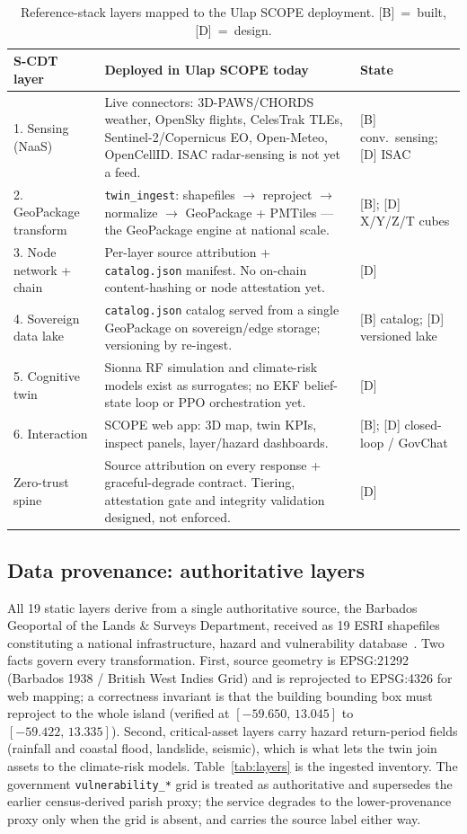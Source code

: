 \documentclass[10pt,twocolumn]{article}
\begin{document}
\begin{table}[t]\footnotesize\centering
\caption{Reference-stack layers mapped to the Ulap SCOPE deployment.
[B]~=~built, [D]~=~design.}\label{tab:map}
\begin{tabular}{@{}p{2.5cm}p{11.1cm}p{2.0cm}@{}}
\toprule
S-CDT layer & Deployed in Ulap SCOPE today & State\\
\midrule
1. Sensing (NaaS) & Live connectors: 3D-PAWS/CHORDS weather, OpenSky flights, CelesTrak TLEs, Sentinel-2/Copernicus EO, Open-Meteo, OpenCellID. ISAC radar-sensing is not yet a feed. & [B] conv.\ sensing; [D] ISAC\\
2. GeoPackage transform & \texttt{twin\_ingest}: shapefiles $\rightarrow$ reproject $\rightarrow$ normalize $\rightarrow$ GeoPackage + PMTiles --- the GeoPackage engine at national scale. & [B]; [D] X/Y/Z/T cubes\\
3. Node network + chain & Per-layer source attribution + \texttt{catalog.json} manifest. No on-chain content-hashing or node attestation yet. & [D]\\
4. Sovereign data lake & \texttt{catalog.json} catalog served from a single GeoPackage on sovereign/edge storage; versioning by re-ingest. & [B] catalog; [D] versioned lake\\
5. Cognitive twin & Sionna RF simulation and climate-risk models exist as surrogates; no EKF belief-state loop or PPO orchestration yet. & [D]\\
6. Interaction & SCOPE web app: 3D map, twin KPIs, inspect panels, layer/hazard dashboards. & [B]; [D] closed-loop / GovChat\\
Zero-trust spine & Source attribution on every response + graceful-degrade contract. Tiering, attestation gate and integrity validation designed, not enforced. & [D]\\
\bottomrule
\end{tabular}
\end{table}

\subsection{Data provenance: authoritative layers}
\label{sec:impl-provenance}
All 19 static layers derive from a single authoritative source, the Barbados
Geoportal of the Lands \& Surveys Department, received as 19 ESRI shapefiles
constituting a national infrastructure, hazard and vulnerability
database~\cite{bbdgeo}. Two facts govern every transformation. First, source
geometry is EPSG:21292 (Barbados 1938 / British West Indies Grid) and is reprojected
to EPSG:4326 for web mapping; a correctness invariant is that the building bounding
box must reproject to the whole island (verified at $[-59.650,\,13.045]$ to
$[-59.422,\,13.335]$). Second, critical-asset layers carry hazard return-period
fields (rainfall and coastal flood, landslide, seismic), which is what lets the twin
join assets to the climate-risk models. Table~\ref{tab:layers} is the ingested
inventory. The government \texttt{vulnerability\_*} grid is treated as authoritative
and supersedes the earlier census-derived parish proxy; the service degrades to the
lower-provenance proxy only when the grid is absent, and carries the source label
either way.
\end{document}
